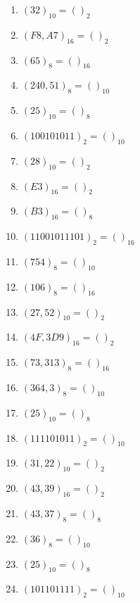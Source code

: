 \documentclass[letter, oneside]{book}
\begin{document}
\begin{enumerate}
\item \((32)_{10} = ( )_{2}\)

\item \((F8,A7)_{16} = ( )_{2}\)

\item \((65)_{8} = ( )_{16}\)

\item \((240,51)_{8} = ( )_{10}\)

\item \((25)_{10} = ( )_{8}\)

\item \((100101011)_{2} = ( )_{10}\)

\item \((28)_{10} = ( )_{2}\)

\item \((E3)_{16} = ( )_{2}\)

\item \((B3)_{16} = ( )_{8}\)

\item \((11001011101)_{2} = ( )_{16}\)

\item \((754)_{8} = ( )_{10}\)

\item \((106)_{8} = ( )_{16}\)

\item \((27,52)_{10} = ( )_{2}\)

\item \((4F,3D9)_{16} = ( )_{2}\)

\item \((73,313)_{8} = ( )_{16}\)

\item \((364,3)_{8} = ( )_{10}\)

\item \((25)_{10} = ( )_{8}\)

\item \((111101011)_{2} = ( )_{10}\)

\item \((31,22)_{10} = ( )_{2}\)

\item \((43,39)_{16} = ( )_{2}\)

\item \((43,37)_{8} = ( )_{8}\)

\item \((36)_{8} = ( )_{10}\)

\item \((25)_{10} = ( )_{8}\)

\item \((101101111)_{2} = ( )_{10}\)
\end{enumerate}
\end{document}
